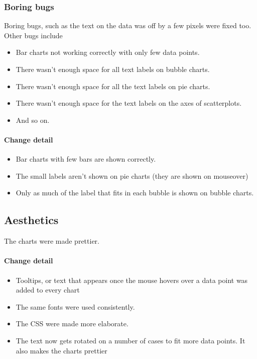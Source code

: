   \subsubsection{Boring bugs}
  Boring bugs, such as the text on the data was off by a few pixels were fixed too.
  Other bugs include 
  \begin{itemize}
  	\item Bar charts not working correctly with only few data points.
  	\item There wasn't enough space for all text labels on bubble charts.
  	\item There wasn't enough space for all the text labels on pie charts.
  	\item There wasn't enough space for the text labels on the axes of scatterplots.
  	\item And so on.
  \end{itemize}
  
  \paragraph{Change detail}
  \begin{itemize}
  	\item Bar charts with few bars are shown correctly. 
  	\item The small labels aren't shown on pie charts (they are shown on mouseover)
  	\item Only as much of the label that fits in each bubble is shown on bubble charts.
\end{itemize}
  

\pagebreak[4]
\subsection{Aesthetics}
The charts were made prettier.
  
\paragraph{Change detail}
\begin{itemize}
  \item Tooltips, or text that appears once the mouse hovers over a data point was added to every chart
  \item The same fonts were used consistently.
  \item The CSS were made more elaborate.
  \item The text now gets rotated on a number of cases to fit more data points. It also makes the charts prettier

\end{itemize}
  
